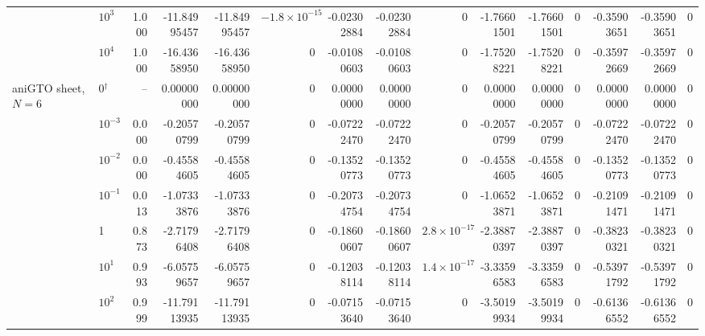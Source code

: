 \begin{tabular}{@{}llr rrr rrr rrr rrr@{}}
 & $10^{3}$ & 1.000 & -11.84995457 & -11.84995457 & \textcolor{green!50!black}{$-1.8\times10^{-15}$} & -0.02302884 & -0.02302884 & \textcolor{green!50!black}{0} & -1.76601501 & -1.76601501 & \textcolor{green!50!black}{0} & -0.35903651 & -0.35903651 & \textcolor{green!50!black}{0} \\
 & $10^{4}$ & 1.000 & -16.43658950 & -16.43658950 & \textcolor{green!50!black}{0} & -0.01080603 & -0.01080603 & \textcolor{green!50!black}{0} & -1.75208221 & -1.75208221 & \textcolor{green!50!black}{0} & -0.35972669 & -0.35972669 & \textcolor{green!50!black}{0} \\
\addlinespace
aniGTO sheet, $N=6$ & 0$^{\dagger}$ & -- & 0.00000000 & 0.00000000 & \textcolor{green!50!black}{0} & 0.00000000 & 0.00000000 & \textcolor{green!50!black}{0} & 0.00000000 & 0.00000000 & \textcolor{green!50!black}{0} & 0.00000000 & 0.00000000 & \textcolor{green!50!black}{0} \\
 & $10^{-3}$ & 0.000 & -0.20570799 & -0.20570799 & \textcolor{green!50!black}{0} & -0.07222470 & -0.07222470 & \textcolor{green!50!black}{0} & -0.20570799 & -0.20570799 & \textcolor{green!50!black}{0} & -0.07222470 & -0.07222470 & \textcolor{green!50!black}{0} \\
 & $10^{-2}$ & 0.000 & -0.45584605 & -0.45584605 & \textcolor{green!50!black}{0} & -0.13520773 & -0.13520773 & \textcolor{green!50!black}{0} & -0.45584605 & -0.45584605 & \textcolor{green!50!black}{0} & -0.13520773 & -0.13520773 & \textcolor{green!50!black}{0} \\
 & $10^{-1}$ & 0.013 & -1.07333876 & -1.07333876 & \textcolor{green!50!black}{0} & -0.20734754 & -0.20734754 & \textcolor{green!50!black}{0} & -1.06523871 & -1.06523871 & \textcolor{green!50!black}{0} & -0.21091471 & -0.21091471 & \textcolor{green!50!black}{0} \\
 & 1 & 0.873 & -2.71796408 & -2.71796408 & \textcolor{green!50!black}{0} & -0.18600607 & -0.18600607 & \textcolor{green!50!black}{$2.8\times10^{-17}$} & -2.38870397 & -2.38870397 & \textcolor{green!50!black}{0} & -0.38230321 & -0.38230321 & \textcolor{green!50!black}{0} \\
 & $10^{1}$ & 0.993 & -6.05759657 & -6.05759657 & \textcolor{green!50!black}{0} & -0.12038114 & -0.12038114 & \textcolor{green!50!black}{$1.4\times10^{-17}$} & -3.33596583 & -3.33596583 & \textcolor{green!50!black}{0} & -0.53971792 & -0.53971792 & \textcolor{green!50!black}{0} \\
 & $10^{2}$ & 0.999 & -11.79113935 & -11.79113935 & \textcolor{green!50!black}{0} & -0.07153640 & -0.07153640 & \textcolor{green!50!black}{0} & -3.50199934 & -3.50199934 & \textcolor{green!50!black}{0} & -0.61366552 & -0.61366552 & \textcolor{green!50!black}{0} \\

\end{tabular}
